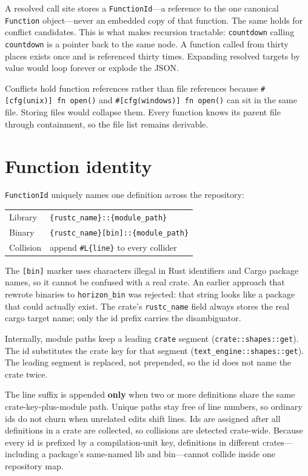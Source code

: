 \documentclass[11pt,a4paper,oneside]{report}
\begin{document}
A resolved call site stores a \texttt{FunctionId}---a reference to the one
canonical \texttt{Function} object---never an embedded copy of that function.
The same holds for conflict candidates. This is what makes recursion
tractable: \texttt{countdown} calling \texttt{countdown} is a pointer back to
the same node. A function called from thirty places exists once and is
referenced thirty times. Expanding resolved targets by value would loop
forever or explode the JSON.

Conflicts hold function references rather than file references because
\texttt{\#[cfg(unix)] fn open()} and \texttt{\#[cfg(windows)] fn open()} can
sit in the same file. Storing files would collapse them. Every function knows
its parent file through containment, so the file list remains derivable.

\section{Function identity}
\label{sec:function-id}

\texttt{FunctionId} uniquely names one definition across the repository:

\begin{center}
\begin{tabular}{@{}ll@{}}
\toprule
Library & \texttt{\{rustc\_name\}::\{module\_path\}} \\
Binary  & \texttt{\{rustc\_name\}[bin]::\{module\_path\}} \\
Collision & append \texttt{\#L\{line\}} to every collider \\
\bottomrule
\end{tabular}
\end{center}

The \texttt{[bin]} marker uses characters illegal in Rust identifiers and
Cargo package names, so it cannot be confused with a real crate. An earlier
approach that rewrote binaries to \texttt{horizon\_bin} was rejected: that
string looks like a package that could actually exist. The crate's
\texttt{rustc\_name} field always stores the real cargo target name; only the
id prefix carries the disambiguator.

Internally, module paths keep a leading \texttt{crate} segment
(\texttt{crate::shapes::get}). The id substitutes the crate key for that
segment (\texttt{text\_engine::shapes::get}). The leading segment is replaced,
not prepended, so the id does not name the crate twice.

The line suffix is appended \textbf{only} when two or more definitions share
the same crate-key-plus-module path. Unique paths stay free of line numbers,
so ordinary ids do not churn when unrelated edits shift lines. Ids are
assigned after all definitions in a crate are collected, so collisions are
detected crate-wide. Because every id is prefixed by a compilation-unit key,
definitions in different crates---including a package's same-named lib and
bin---cannot collide inside one repository map.
\end{document}
